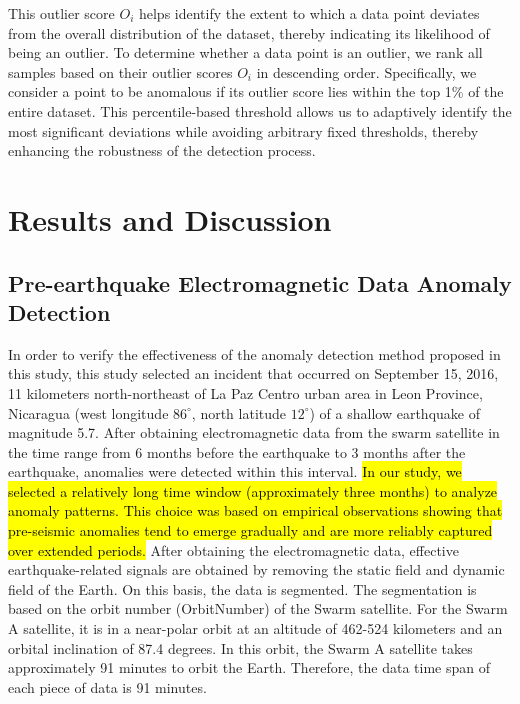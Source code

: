 \documentclass[3p,authoryear,preprint,12pt]{elsarticle}
\begin{document}
This outlier score $O_i$  helps identify the extent to which a data point deviates from the overall distribution of the dataset, thereby indicating its likelihood of being an outlier. {To determine whether a data point is an outlier, we rank all samples based on their outlier scores $O_i$ in descending order. Specifically, we consider a point to be anomalous if its outlier score lies within the top 1\% of the entire dataset. This percentile-based threshold allows us to adaptively identify the most significant deviations while avoiding arbitrary fixed thresholds, thereby enhancing the robustness of the detection process.}   
\section{Results and Discussion}
\subsection{Pre-earthquake Electromagnetic Data Anomaly Detection}
{In order to verify the effectiveness of the anomaly detection method proposed in this study, this study selected an incident that occurred on September 15, 2016, 11 kilometers north-northeast of La Paz Centro urban area in Leon Province, Nicaragua (west longitude $86^\circ$, north latitude $12^\circ$) of a shallow earthquake of magnitude 5.7. After obtaining electromagnetic data from the swarm satellite in the time range from 6 months before the earthquake to 3 months after the earthquake, anomalies were detected within this interval. \hl{In our study, we selected a relatively long time window (approximately three months) to analyze anomaly patterns. This choice was based on empirical observations showing that pre-seismic anomalies tend to emerge gradually and are more reliably captured over extended periods.} After obtaining the electromagnetic data, effective earthquake-related signals are obtained by removing the static field and dynamic field of the Earth. On this basis, the data is segmented. The segmentation is based on the orbit number (OrbitNumber) of the Swarm satellite. For the Swarm A satellite, it is in a near-polar orbit at an altitude of 462-524 kilometers and an orbital inclination of 87.4 degrees. In this orbit, the Swarm A satellite takes approximately 91 minutes to orbit the Earth. Therefore, the data time span of each piece of data is 91 minutes.}
\end{document}
